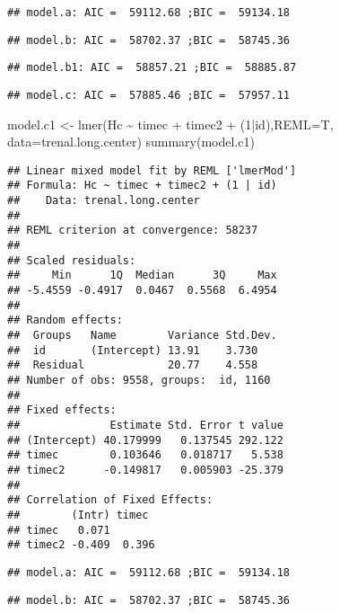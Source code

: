 \documentclass[
]{article}
\newenvironment{Shaded}{\begin{snugshade}}{\end{snugshade}}
\newcommand{\AttributeTok}[1]{\textcolor[rgb]{0.77,0.63,0.00}{#1}}
\newcommand{\DecValTok}[1]{\textcolor[rgb]{0.00,0.00,0.81}{#1}}
\newcommand{\FunctionTok}[1]{\textcolor[rgb]{0.00,0.00,0.00}{#1}}
\newcommand{\NormalTok}[1]{#1}
\newcommand{\OtherTok}[1]{\textcolor[rgb]{0.56,0.35,0.01}{#1}}
\newcommand{\SpecialCharTok}[1]{\textcolor[rgb]{0.00,0.00,0.00}{#1}}
\begin{document}
\begin{verbatim}
## model.a: AIC =  59112.68 ;BIC =  59134.18
\end{verbatim}

\begin{verbatim}
## model.b: AIC =  58702.37 ;BIC =  58745.36
\end{verbatim}

\begin{verbatim}
## model.b1: AIC =  58857.21 ;BIC =  58885.87
\end{verbatim}

\begin{verbatim}
## model.c: AIC =  57885.46 ;BIC =  57957.11
\end{verbatim}

\begin{Shaded}
\begin{Highlighting}[]
\NormalTok{model.c1 }\OtherTok{\textless{}{-}} \FunctionTok{lmer}\NormalTok{(Hc }\SpecialCharTok{\textasciitilde{}}\NormalTok{ timec }\SpecialCharTok{+}\NormalTok{ timec2 }\SpecialCharTok{+}\NormalTok{ (}\DecValTok{1}\SpecialCharTok{|}\NormalTok{id),}\AttributeTok{REML=}\NormalTok{T, }\AttributeTok{data=}\NormalTok{trenal.long.center)}
\FunctionTok{summary}\NormalTok{(model.c1)}
\end{Highlighting}
\end{Shaded}

\begin{verbatim}
## Linear mixed model fit by REML ['lmerMod']
## Formula: Hc ~ timec + timec2 + (1 | id)
##    Data: trenal.long.center
## 
## REML criterion at convergence: 58237
## 
## Scaled residuals: 
##     Min      1Q  Median      3Q     Max 
## -5.4559 -0.4917  0.0467  0.5568  6.4954 
## 
## Random effects:
##  Groups   Name        Variance Std.Dev.
##  id       (Intercept) 13.91    3.730   
##  Residual             20.77    4.558   
## Number of obs: 9558, groups:  id, 1160
## 
## Fixed effects:
##              Estimate Std. Error t value
## (Intercept) 40.179999   0.137545 292.122
## timec        0.103646   0.018717   5.538
## timec2      -0.149817   0.005903 -25.379
## 
## Correlation of Fixed Effects:
##        (Intr) timec 
## timec   0.071       
## timec2 -0.409  0.396
\end{verbatim}

\begin{verbatim}
## model.a: AIC =  59112.68 ;BIC =  59134.18
\end{verbatim}

\begin{verbatim}
## model.b: AIC =  58702.37 ;BIC =  58745.36
\end{verbatim}
\end{document}
